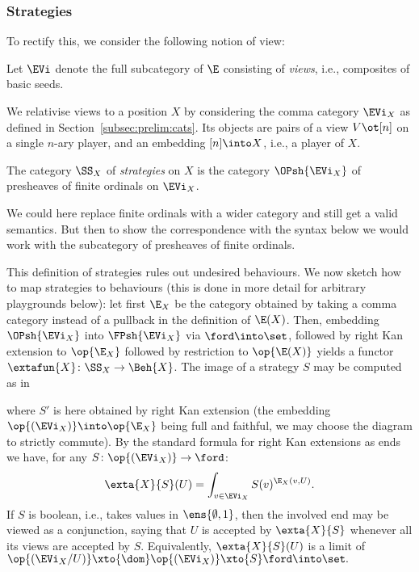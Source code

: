 \documentclass{LMCS}
\theoremstyle{plain}\newtheorem{satz}[thm]{Satz}
\begin{document}
\subsubsection{Strategies}\label{subsubsec:strategies}
To rectify this, we consider the following notion of view:
\begin{defi}
  Let $\EVi$ denote the full subcategory of $\E$ consisting of \emph{views}, i.e.,
  composites of basic seeds.
\end{defi}
We relativise views to a position $X$ by considering the comma
category $\EVi_X$ as defined in Section~\ref{subsec:prelim:cats}.  Its
objects are pairs of a view $V \ot [n]$ on a single $n$-ary player,
and an embedding $[n] \into X$, i.e., a player of $X$.

    \begin{defi}
     The category $\SS_X$ of \emph{strategies} on $X$ is the category
     $\OPsh{\EVi_X}$ of presheaves of finite ordinals on $\EVi_X$.
    \end{defi}
   \begin{rem}
     We could here replace finite ordinals with a wider category and
     still get a valid semantics. But then to show the correspondence
     with the syntax below we would work with the subcategory of
     presheaves of finite ordinals.
   \end{rem}
    
   This definition of strategies rules out undesired behaviours. We
   now sketch how to map strategies to behaviours (this is done in
   more detail for arbitrary playgrounds below): let first $\E_X$ be
   the category obtained by taking a comma category instead of a
   pullback in the definition of $\E (X)$.  Then, embedding
   $\OPsh{\EVi_X}$ into $\FPsh{\EVi_X}$ via $\ford \into \set$,
   followed by right Kan extension to $\op{\E_X}$ followed by
   restriction to $\op{\E(X)}$ yields a functor $\extafun{X} \colon
   \SS_X \to \Beh{X}$. The image of a strategy $S$ may be computed as in
    \begin{center}
    \end{center}
    where $S'$ is here obtained by right Kan extension (the embedding
    $\op{(\EVi_X)} \into \op{\E_X}$ being full and faithful, we may
    choose the diagram to strictly commute).
    By the standard formula for right Kan extensions as
    ends~\citep{MacLane:cwm} we have, for any $S \colon \op{(\EVi_X)} \to \ford$: 
    $$\exta{X}{S} (U) =
    \int_{v \in \EVi_X} S (v)^{\E_X (v,U)}.$$ If $S$ is boolean, i.e.,
    takes values in $\ens{\emptyset,1}$, then the involved end may be
    viewed as a conjunction, saying that $U$ is accepted by $\exta{X}{S}$
    whenever all its views are accepted by $S$.  Equivalently,
    $\exta{X}{S} (U)$ is a limit of $\op{(\EVi_X / U)} \xto{\dom}
    \op{(\EVi_X)} \xto{S} \ford \into \set.$
\end{document}
